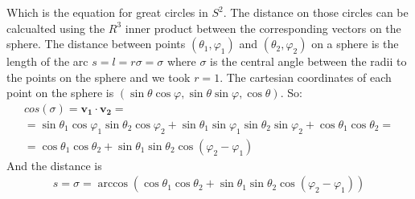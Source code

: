 \documentclass{article}
\begin{document}
Which is the equation for great circles in $S^2$.
\newline
The distance on those circles can be calcualted using the $R^3$ inner product between the corresponding vectors on the sphere. The distance between points $(\theta_1, \varphi_1)$ and $(\theta_2, \varphi_2)$ on a sphere is the length of the arc $s = l = r\sigma = \sigma$ where $\sigma$ is the central angle between the radii to the points on the sphere and we took $r = 1$.
\newline
The cartesian coordinates of each point on the sphere is $(\sin\theta\cos\varphi, \sin\theta\sin\varphi, \cos\theta)$. So:
\begin{equation}
\begin{gathered}
    cos(\sigma) = \boldsymbol{v_1}\cdot\boldsymbol{v_2} = 
    \\
    = \sin\theta_1\cos\varphi_1\sin\theta_2\cos\varphi_2 + \sin\theta_1\sin\varphi_1\sin\theta_2\sin\varphi_2 + \cos\theta_1\cos\theta_2 =
    \\
    = \cos\theta_1\cos\theta_2 + \sin\theta_1\sin\theta_2\cos\left(\varphi_2 - \varphi_1\right)
\end{gathered}
\end{equation}
And the distance is
\begin{eqnarray}
    s = \sigma = \arccos\left(\cos\theta_1\cos\theta_2 + \sin\theta_1\sin\theta_2\cos\left(\varphi_2 - \varphi_1\right)\right)
\end{eqnarray}
\end{document}
